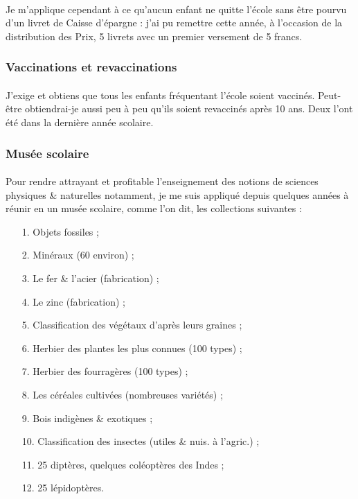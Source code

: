 \documentclass[../eBook.tex]{subfiles}
\begin{document}
      \paragraph{}Je m'applique cependant à ce qu'aucun enfant ne quitte l'école sans être pourvu d'un livret de Caisse d'épargne : j'ai pu remettre cette année, à l'occasion de la distribution des Prix, 5 livrets avec un premier versement de 5 francs.

    \subsubsection*{Vaccinations et revaccinations}
      \paragraph{}J'exige et obtiens que tous les enfants fréquentant l'école soient vaccinés. Peut-être obtiendrai-je aussi peu à peu qu'ils soient revaccinés après 10 ans. Deux l'ont été dans la dernière année scolaire.

    \subsubsection*{Musée scolaire}
      \paragraph{}Pour rendre attrayant et profitable l'enseignement des notions de sciences physiques \& naturelles notamment, je me suis appliqué depuis quelques années à réunir en un musée scolaire, comme l'on dit, les collections suivantes :
      \begin{itemize}[noitemsep]
        \setlength{\baselineskip}{16pt}
        \item[1.] Objets fossiles ;
        \item[2.] Minéraux (60 environ) ;
        \item[3.] Le fer \& l'acier (fabrication) ;
        \item[4.] Le zinc (fabrication) ;
        \item[5.] Classification des végétaux d'après leurs graines ;
        \item[6.] Herbier des plantes les plus connues (100 types) ;
        \item[7.] Herbier des fourragères (100 types) ;
        \item[8.] Les céréales cultivées (nombreuses variétés) ;
        \item[9.] Bois indigènes \& exotiques ;
        \item[10.] Classification des insectes (utiles \& nuis. à l'agric.) ;
        \item[11.] 25 diptères, quelques coléoptères des Indes ;
        \item[12.] 25 lépidoptères.
      \end{itemize}
\end{document}
